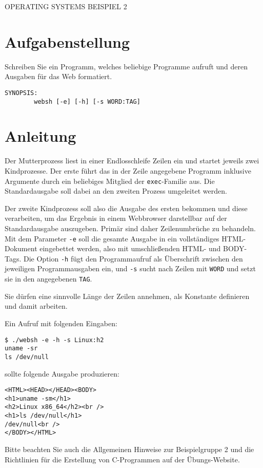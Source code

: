 \documentclass{article}
\begin{document}
\begin{center}
\begin{Large}
OPERATING SYSTEMS BEISPIEL 2
\end{Large}
\end{center}




\section*{Aufgabenstellung}

Schreiben Sie ein Programm, welches beliebige Programme aufruft und
deren Ausgaben für das Web formatiert.

\begin{verbatim}
SYNOPSIS:
        websh [-e] [-h] [-s WORD:TAG]
\end{verbatim}



\section*{Anleitung}

Der Mutterprozess liest in einer Endlosschleife Zeilen ein und startet
jeweils zwei Kindprozesse. Der erste führt das in der Zeile angegebene
Programm inklusive Argumente durch ein beliebiges Mitglied der
\verb_exec_-Familie aus. Die Standardausgabe soll dabei an den zweiten
Prozess umgeleitet werden.

Der zweite Kindprozess soll also die Ausgabe des ersten bekommen und
diese verarbeiten, um das Ergebnis in einem Webbrowser darstellbar auf
der Standardausgabe auszugeben. Primär sind daher Zeilenumbrüche zu
behandeln. Mit dem Parameter \verb_-e_ soll die gesamte Ausgabe in ein
vollständiges HTML-Dokument eingebettet werden, also mit
umschließenden HTML- und BODY-Tags. Die Option \verb_-h_ fügt den
Programmaufruf als Überschrift zwischen den jeweiligen
Programmausgaben ein, und \verb_-s_ sucht nach Zeilen mit \verb_WORD_
und setzt sie in den angegebenen \verb_TAG_.

Sie dürfen eine sinnvolle Länge der Zeilen annehmen, als Konstante
definieren und damit arbeiten.

Ein Aufruf mit folgenden Eingaben: 

\begin{verbatim}
$ ./websh -e -h -s Linux:h2
uname -sr
ls /dev/null
\end{verbatim}

sollte folgende Ausgabe produzieren:

\begin{verbatim}
<HTML><HEAD></HEAD><BODY>
<h1>uname -sm</h1>
<h2>Linux x86_64</h2><br />
<h1>ls /dev/null</h1>
/dev/null<br />
</BODY></HTML> 
\end{verbatim}

Bitte beachten Sie auch die Allgemeinen Hinweise zur
Beispielgruppe 2 und die Richtlinien für die Erstellung von
C-Programmen auf der Übungs-Website.
\end{document}
